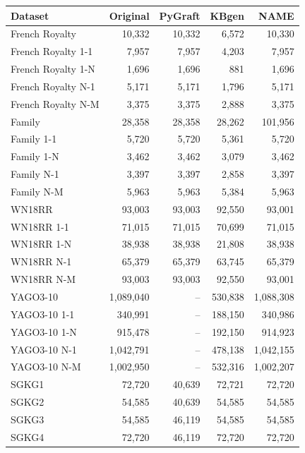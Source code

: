 \begin{tabular}{lrrrr}
\toprule
Dataset & Original & PyGraft & KBgen & NAME \\
\midrule
French Royalty & 10{,}332 & 10{,}332 & 6{,}572 & 10{,}330 \\
French Royalty 1-1 & 7{,}957 & 7{,}957 & 4{,}203 & 7{,}957 \\
French Royalty 1-N & 1{,}696 & 1{,}696 & 881 & 1{,}696 \\
French Royalty N-1 & 5{,}171 & 5{,}171 & 1{,}796 & 5{,}171 \\
French Royalty N-M & 3{,}375 & 3{,}375 & 2{,}888 & 3{,}375 \\
\midrule
Family & 28{,}358 & 28{,}358 & 28{,}262 & 101{,}956 \\
Family 1-1 & 5{,}720 & 5{,}720 & 5{,}361 & 5{,}720 \\
Family 1-N & 3{,}462 & 3{,}462 & 3{,}079 & 3{,}462 \\
Family N-1 & 3{,}397 & 3{,}397 & 2{,}858 & 3{,}397 \\
Family N-M & 5{,}963 & 5{,}963 & 5{,}384 & 5{,}963 \\
\midrule
WN18RR & 93{,}003 & 93{,}003 & 92{,}550 & 93{,}001 \\
WN18RR 1-1 & 71{,}015 & 71{,}015 & 70{,}699 & 71{,}015 \\
WN18RR 1-N & 38{,}938 & 38{,}938 & 21{,}808 & 38{,}938 \\
WN18RR N-1 & 65{,}379 & 65{,}379 & 63{,}745 & 65{,}379 \\
WN18RR N-M & 93{,}003 & 93{,}003 & 92{,}550 & 93{,}001 \\
\midrule
YAGO3-10 & 1{,}089{,}040 & – & 530{,}838 & 1{,}088{,}308 \\
YAGO3-10 1-1 & 340{,}991 & – & 188{,}150 & 340{,}986 \\
YAGO3-10 1-N & 915{,}478 & – & 192{,}150 & 914{,}923 \\
YAGO3-10 N-1 & 1{,}042{,}791 & – & 478{,}138 & 1{,}042{,}155 \\
YAGO3-10 N-M & 1{,}002{,}950 & – & 532{,}316 & 1{,}002{,}207 \\
\midrule
SGKG1 & 72{,}720 & 40{,}639 & 72{,}721 & 72{,}720 \\
SGKG2 & 54{,}585 & 40{,}639 & 54{,}585 & 54{,}585 \\
SGKG3 & 54{,}585 & 46{,}119 & 54{,}585 & 54{,}585 \\
SGKG4 & 72{,}720 & 46{,}119 & 72{,}720 & 72{,}720 \\
\bottomrule
\end{tabular}
